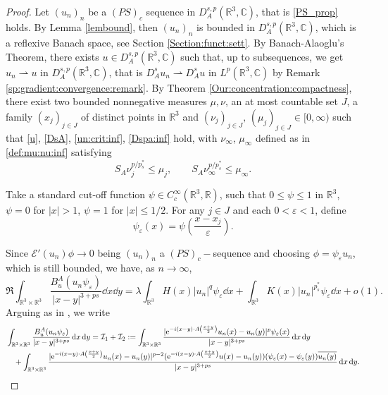 \documentclass[leqno,11pt]{amsart}
\newcommand{\R}{\mathbb R}
\newcommand{\C}{\mathbb C}
\newcommand{\cE}{{\mathcal E}}
\newcommand{\cI}{{\mathcal I}}
\newcommand{\eps}{\varepsilon}
\numberwithin{equation}{section}
\def\e{{\rm e}}
\newcommand{\expAminus}{\e^{-i(x-y)\cdot A\left(\frac{x+y}{2}\right)}}
\begin{document}
\begin{proof}
Let $(u_n)_n$ be a $(PS)_c$ sequence in $D^{s,p}_A(\R^3,\C)$, that is \eqref{PS_prop} holds. By Lemma \ref{lembound}, then $(u_n)_n$ is bounded in $D^{s,p}_A(\R^3,\C)$, which is a reflexive Banach space, see Section \ref{Section:funct:sett}.
By Banach-Alaoglu's Theorem,
 there exists $u\in D^{s,p}_A(\R^3,\C)$ 
 such that, up to subsequences, we get
$u_n\rightharpoonup u$ in $D^{s,p}_A(\R^3,\C)$, that is $D^s_Au_{n}\rightharpoonup D^s_A u$ in $L^p(\R^3,\C)$ by Remark \ref{sp:gradient:convergence:remark}.
By Theorem \ref{Our:concentration:compactness}, there exist two bounded nonnegative measures $\mu,\nu$, an at most countable set $J$, a family $(x_j)_{j\in J}$ of distinct points in
$\R^3$ and $(\nu_j)_{j\in J}, \,(\mu_j)_{j\in J}\in [0,\infty)$ such that \eqref{u}, \eqref{DsA}, 
\eqref{un:crit:inf}, \eqref{Dspa:inf} hold, with $\nu_\infty$, $\mu_\infty$ defined as in \eqref{def:mu:nu:inf}
satisfying
\begin{equation}\label{6.22}
S_A\nu_{j}^{p/p^*_s}\le\mu_{j}, \qquad S_A\nu_{\infty}^{p/p^*_s}\le \mu_\infty.
\end{equation}

Take a standard cut-off function $\psi\in C_c^{\infty}(\R^3,\R)$, such that $0\le\psi\le1$ in $\R^3$,
$\psi=0$ for $|x|>1$, $\psi=1$ for $|x|\le 1/2$. For any $j\in J$ and each $0<\eps<1$, define
$$\psi_{\eps}(x)=\psi\left(\frac{x-x_{j}}{\eps}\right).$$


Since $\cE'(u_{n})\phi\to0$ being $(u_{n})_n$ a $(PS)_c-$sequence and 
choosing $\phi=\psi_\eps u_n$, which is still bounded,  we have, as $n\to\infty$,
\begin{equation}\label{dis1}
    \Re\int_{\R^3\times \R^3}\frac{B^A_u(u_n\psi_\eps)}{|x-y|^{3+ps}} \dd x \dd y=\lambda\int_{\R^3} H(x)|u_n|^q\psi_\eps  \dd x+\int_{\R^3}K(x)|u_n|^{p^*_s}\psi_\eps \dd x+o(1).
\end{equation}
Arguing as in \cite{BonderSaintierSilva}, we write
\begin{equation}
    \begin{aligned}
    &\int_{\R^3\times \R^3}\frac{B^A_u(u_n\psi_\eps)}{|x-y|^{3+ps}} \dd x \dd y= \cI_1 + \cI_2:=\int_{\R^3\times \R^3}\frac{|\expAminus u_n(x) - u_n(y)|^p\psi_\eps(x)}{|x-y|^{3+ps}} \dd x \dd y \\
        & \quad +
        \int_{\R^3\times \R^3}\frac{|\expAminus u_n(x) - u_n(y)|^{p-2}(\expAminus u(x) -  u_n(y))(\psi_\eps(x)-\psi_\eps(y))\overline{u_n(y)}}{|x-y|^{3+ps}} \dd x \dd y.
    \end{aligned}
\end{equation}



\end{proof}
\end{document}
